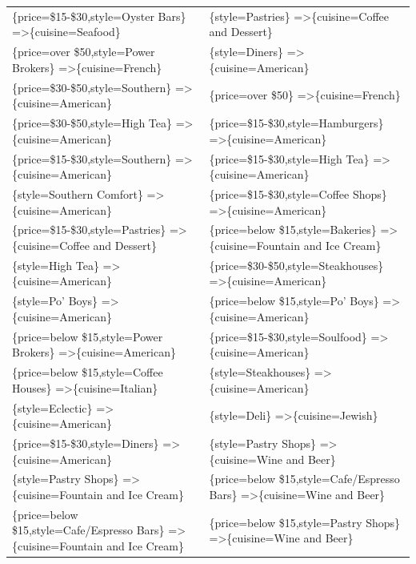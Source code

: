 \documentclass[letterpaper,10pt]{article}
\begin{document}
\begin{appendices}
\begin{table}[h]
\begin{adjustbox}{max width=\textwidth}
\begin{tabular}{ll}
\{price=\$15-\$30,style=Oyster Bars\} =\textgreater \{cuisine=Seafood\} & \{style=Pastries\} =\textgreater \{cuisine=Coffee and Dessert\} \\ 
\{price=over \$50,style=Power Brokers\} =\textgreater \{cuisine=French\} & \{style=Diners\} =\textgreater \{cuisine=American\} \\ 
\{price=\$30-\$50,style=Southern\} =\textgreater \{cuisine=American\} & \{price=over \$50\} =\textgreater \{cuisine=French\} \\ 
\{price=\$30-\$50,style=High Tea\} =\textgreater \{cuisine=American\} & \{price=\$15-\$30,style=Hamburgers\} =\textgreater \{cuisine=American\} \\ 
\{price=\$15-\$30,style=Southern\} =\textgreater \{cuisine=American\} & \{price=\$15-\$30,style=High Tea\} =\textgreater \{cuisine=American\} \\ 
\{style=Southern Comfort\} =\textgreater \{cuisine=American\} & \{price=\$15-\$30,style=Coffee Shops\} =\textgreater \{cuisine=American\} \\ 
\{price=\$15-\$30,style=Pastries\} =\textgreater \{cuisine=Coffee and Dessert\} & \{price=below \$15,style=Bakeries\} =\textgreater \{cuisine=Fountain and Ice Cream\} \\ 
\{style=High Tea\} =\textgreater \{cuisine=American\} & \{price=\$30-\$50,style=Steakhouses\} =\textgreater \{cuisine=American\} \\ 
\{style=Po' Boys\} =\textgreater \{cuisine=American\} & \{price=below \$15,style=Po' Boys\} =\textgreater \{cuisine=American\} \\ 
\{price=below \$15,style=Power Brokers\} =\textgreater \{cuisine=American\} & \{price=\$15-\$30,style=Soulfood\} =\textgreater \{cuisine=American\} \\ 
\{price=below \$15,style=Coffee Houses\} =\textgreater \{cuisine=Italian\} & \{style=Steakhouses\} =\textgreater \{cuisine=American\} \\ 
\{style=Eclectic\} =\textgreater \{cuisine=American\} & \{style=Deli\} =\textgreater \{cuisine=Jewish\} \\ 
\{price=\$15-\$30,style=Diners\} =\textgreater \{cuisine=American\} & \{style=Pastry Shops\} =\textgreater \{cuisine=Wine and Beer\} \\ 
\{style=Pastry Shops\} =\textgreater \{cuisine=Fountain and Ice Cream\} & \{price=below \$15,style=Cafe/Espresso Bars\} =\textgreater \{cuisine=Wine and Beer\} \\ 
\{price=below \$15,style=Cafe/Espresso Bars\} =\textgreater \{cuisine=Fountain and Ice Cream\} & \{price=below \$15,style=Pastry Shops\} =\textgreater \{cuisine=Wine and Beer\} \\ 

\end{tabular}
\end{adjustbox}
\end{table}
\end{appendices}
\end{document}
